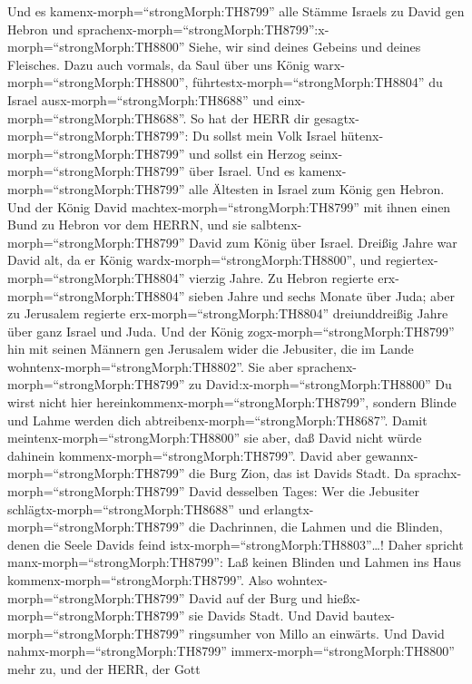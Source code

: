  Und es kamenx-morph=``strongMorph:TH8799'' alle Stämme
Israels zu David gen Hebron und
sprachenx-morph=``strongMorph:TH8799'':x-morph=``strongMorph:TH8800''
Siehe, wir sind deines Gebeins und deines Fleisches.  Dazu
auch vormals, da Saul über uns König warx-morph=``strongMorph:TH8800'',
führtestx-morph=``strongMorph:TH8804'' du Israel
ausx-morph=``strongMorph:TH8688'' und einx-morph=``strongMorph:TH8688''.
So hat der HERR dir gesagtx-morph=``strongMorph:TH8799'': Du sollst mein
Volk Israel hütenx-morph=``strongMorph:TH8799'' und sollst ein Herzog
seinx-morph=``strongMorph:TH8799'' über Israel.  Und es
kamenx-morph=``strongMorph:TH8799'' alle Ältesten in Israel zum König
gen Hebron. Und der König David machtex-morph=``strongMorph:TH8799'' mit
ihnen einen Bund zu Hebron vor dem HERRN, und sie
salbtenx-morph=``strongMorph:TH8799'' David zum König über Israel.
 Dreißig Jahre war David alt, da er König
wardx-morph=``strongMorph:TH8800'', und
regiertex-morph=``strongMorph:TH8804'' vierzig Jahre.  Zu
Hebron regierte erx-morph=``strongMorph:TH8804'' sieben Jahre und sechs
Monate über Juda; aber zu Jerusalem regierte
erx-morph=``strongMorph:TH8804'' dreiunddreißig Jahre über ganz Israel
und Juda.  Und der König zogx-morph=``strongMorph:TH8799''
hin mit seinen Männern gen Jerusalem wider die Jebusiter, die im Lande
wohntenx-morph=``strongMorph:TH8802''. Sie aber
sprachenx-morph=``strongMorph:TH8799'' zu
David:x-morph=``strongMorph:TH8800'' Du wirst nicht hier
hereinkommenx-morph=``strongMorph:TH8799'', sondern Blinde und Lahme
werden dich abtreibenx-morph=``strongMorph:TH8687''. Damit
meintenx-morph=``strongMorph:TH8800'' sie aber, daß David nicht würde
dahinein kommenx-morph=``strongMorph:TH8799''.  David aber
gewannx-morph=``strongMorph:TH8799'' die Burg Zion, das ist Davids
Stadt.  Da sprachx-morph=``strongMorph:TH8799'' David
desselben Tages: Wer die Jebusiter schlägtx-morph=``strongMorph:TH8688''
und erlangtx-morph=``strongMorph:TH8799'' die Dachrinnen, die Lahmen und
die Blinden, denen die Seele Davids feind
istx-morph=``strongMorph:TH8803''\ldots! Daher spricht
manx-morph=``strongMorph:TH8799'': Laß keinen Blinden und Lahmen ins
Haus kommenx-morph=``strongMorph:TH8799''.  Also
wohntex-morph=``strongMorph:TH8799'' David auf der Burg und
hießx-morph=``strongMorph:TH8799'' sie Davids Stadt. Und David
bautex-morph=``strongMorph:TH8799'' ringsumher von Millo an einwärts.
 Und David nahmx-morph=``strongMorph:TH8799''
immerx-morph=``strongMorph:TH8800'' mehr zu, und der HERR, der Gott
